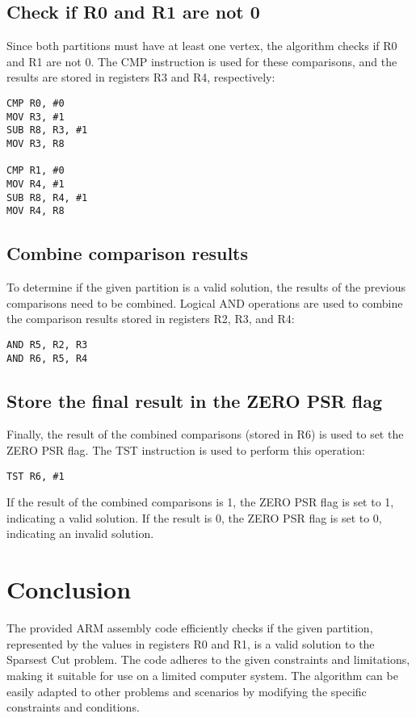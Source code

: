 \subsection{Check if R0 and R1 are not 0}

Since both partitions must have at least one vertex, the algorithm checks if R0 and R1 are not 0. The CMP instruction is used for these comparisons, and the results are stored in registers R3 and R4, respectively:

\begin{verbatim}
CMP R0, #0
MOV R3, #1
SUB R8, R3, #1
MOV R3, R8

CMP R1, #0
MOV R4, #1
SUB R8, R4, #1
MOV R4, R8
\end{verbatim}

\subsection{Combine comparison results}

To determine if the given partition is a valid solution, the results of the previous comparisons need to be combined. Logical AND operations are used to combine the comparison results stored in registers R2, R3, and R4:

\begin{verbatim}
AND R5, R2, R3
AND R6, R5, R4
\end{verbatim}

\subsection{Store the final result in the ZERO PSR flag}

Finally, the result of the combined comparisons (stored in R6) is used to set the ZERO PSR flag. The TST instruction is used to perform this operation:

\begin{verbatim}
TST R6, #1
\end{verbatim}

If the result of the combined comparisons is 1, the ZERO PSR flag is set to 1, indicating a valid solution. If the result is 0, the ZERO PSR flag is set to 0, indicating an invalid solution.

\section{Conclusion}

The provided ARM assembly code efficiently checks if the given partition, represented by the values in registers R0 and R1, is a valid solution to the Sparsest Cut problem. The code adheres to the given constraints and limitations, making it suitable for use on a limited computer system. The algorithm can be easily adapted to other problems and scenarios by modifying the specific constraints and conditions.

